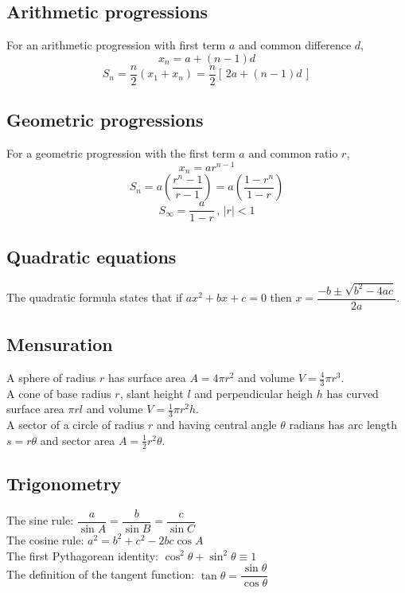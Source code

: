 \documentclass[class=exam, crop=false, 12pt]{standalone}
\begin{document}
\subsection*{Arithmetic progressions}
For an arithmetic progression with first term $a$ and common difference $d$,
\[ x_{n} = a + (n-1)d\]
\[ S_{n} = \frac{n}{2}(x_{1} + x_{n}) = \frac{n}{2}[\,2a+(n-1)d\,] \]

\subsection*{Geometric progressions}
For a geometric progression with the first term $a$ and common ratio $r$,
\[ x_{n} = ar^{n-1} \]
\[ S_{n} = a \left( \frac{r^{n} -1}{r-1} \right) = a \left( \frac{1 - r^{n} }{1-r} \right) \]
\[ S_{\infty} = \frac{a}{1-r} \, , \, |r| < 1 \]

\subsection*{Quadratic equations}
The quadratic formula states that if $ax^{2}+bx+c = 0$ then $ x = \dfrac{-b \pm \sqrt{b^{2} - 4ac}}{2a}$.

\subsection*{Mensuration}
A sphere of radius $r$ has surface area $A = 4\pi r^{2}$ and volume $V = \frac{4}{3}\pi r^{3}$.\vspace{0.1in}\\ 
A cone of base radius $r$, slant height $l$ and perpendicular heigh $h$ has curved surface area $\pi rl$ and volume $V = \frac{1}{3}\pi r^{2}h$.\vspace{0.1in}\\
A sector of a circle of radius $r$ and having central angle $\theta$ radians has arc length $s=r\theta$ and sector area $A = \frac{1}{2}r^{2}\theta$.

\subsection*{Trigonometry}
The sine rule: $\dfrac{a}{\sin{A}} = \dfrac{b}{\sin{B}} = \dfrac{c}{\sin{C}}$\vspace{0.1in}\\
The cosine rule: $a^{2} = b^{2} + c^{2} - 2bc\cos{A}$\vspace{0.1in}\\
The first Pythagorean identity: $\cos^{2}{\theta} + \sin^{2}{\theta} \equiv 1$\vspace{0.1in}\\
The definition of the tangent function: $\tan{\theta} = \dfrac{\sin{\theta}}{\cos{\theta}}$
\end{document}
